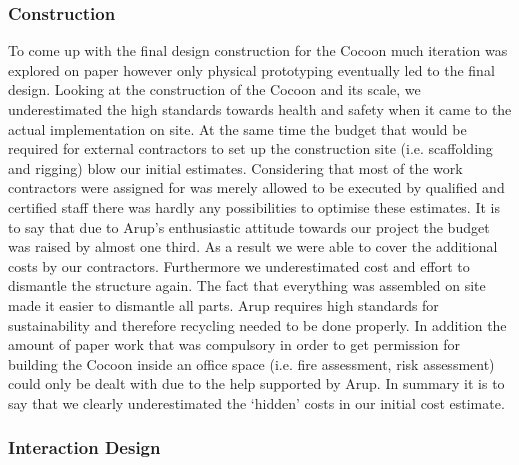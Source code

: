 \subsubsection*{Construction}

To come up with the final design construction for the Cocoon much iteration was explored on paper however only physical prototyping eventually led to the final design. Looking at the construction of the Cocoon and its scale, we underestimated the high standards towards health and safety when it came to the actual implementation on site. At  the same time the budget that would be required for external contractors to set up the construction site (i.e. scaffolding and rigging) blow our initial estimates. Considering that most of the work contractors were assigned for was merely allowed to be executed by qualified and certified staff there was hardly any possibilities to optimise these estimates. It is to say that due to Arup’s enthusiastic attitude towards our project the budget was raised by almost one third. As a result we were able to cover the additional costs by our contractors.
Furthermore we underestimated cost and effort to dismantle the structure again. The fact that everything was assembled on site made it easier to dismantle all parts. Arup requires high standards for sustainability and therefore recycling needed to be done properly.   
In addition the amount of paper work that was compulsory in order to get permission for building the Cocoon inside an office space (i.e. fire assessment, risk assessment) could only be dealt with due to the help supported by Arup. In summary it is to say that we clearly underestimated the ‘hidden’ costs in our initial cost estimate.

\subsubsection*{Interaction Design}

